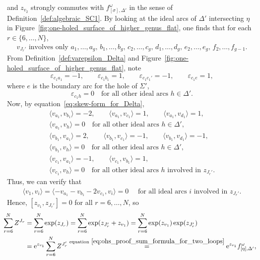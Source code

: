 \documentclass[10pt,a4paper]{amsart}
\numberwithin{equation}{section}
\theoremstyle{definition}
\begin{document}
and $z_{v_2}$ strongly commutes with $f^\omega_{[\sigma],\Delta'}$ in the sense of Definition~\ref{def:algebraic_SC1}.
By looking at the ideal arcs of $\Delta'$ intersecting $\eta$ in Figure~\ref{fig:one-holed_surface_of_higher_genus_flat}, one finds that for each $r\in\{6,\dots,N\}$,
\begin{align}
\label{eq:ohs_proof_v_J_r_prime_involves}
\mbox{$v_{J_r'}$ involves only $a_1,\dots,a_g$, $b_1,\dots,b_g$, $c_2,\dots,c_g$, $d_1,\dots,d_g$, $e_2,\dots,e_g$, $f_2,\dots,f_{g-1}$.}\!\!\!
\end{align}
From Definition~\ref{def:varepsilon_Delta} and Figure~\ref{fig:one-holed_surface_of_higher_genus_flat}, note
\[
\varepsilon_{c_1 a_1} = -1, \qquad
\varepsilon_{c_1 b_1} = 1, \qquad
\varepsilon_{c_1 c_1'} = -1, \qquad
\varepsilon_{c_1 e} = 1,
\]
where $e$ is the boundary arc for the hole of $\Sigma'$,
\[
\varepsilon_{c_1 h} =0 \quad \mbox{for all other ideal arcs $h \in \Delta'$}.
\]
Now, by equation~\eqref{eq:skew-form_for_Delta},
\begin{gather*}
 \langle v_{a_1}, v_{b_1}\rangle = -2, \qquad
\langle v_{a_1}, v_{c_1}\rangle = 1, \qquad
\langle v_{a_1}, v_{d_1}\rangle = 1, \\
\langle v_{a_1},v_h\rangle=0 \quad \mbox{for all other ideal arcs $h \in \Delta'$}, \\
\langle v_{b_1}, v_{a_1}\rangle=2,\qquad
\langle v_{b_1}, v_{c_1}\rangle = -1,\qquad
\langle v_{b_1},v_{d_1}\rangle = -1, \\
\langle v_{b_1},v_h\rangle=0 \quad \mbox{for all other ideal arcs $h \in \Delta'$}, \\
\langle v_{c_1}, v_{a_1}\rangle = -1, \qquad
\langle v_{c_1}, v_{b_1}\rangle = 1, \\
\langle v_{c_1}, v_h\rangle=0 \quad \mbox{for all other ideal arcs $h$ involved in $z_{J_r'}$}.
\end{gather*}
Thus, we can verify that
\begin{align}
\label{eq:ohs_proof_some_commutations2}
\langle v_1, v_i \rangle = \langle -v_{a_1}-v_{b_1}-2v_{c_1},v_i \rangle = 0 \quad \mbox{ for all ideal arcs $i$ involved in $z_{J_r'}$.}
\end{align}
Hence, $[z_{v_1},z_{J_r'}]=0$ for all $r=6,\dots,N$, so
\begin{align*}
\hspace{-2mm} \sum_{r=6}^{N} Z^{J_r} & = \sum_{r=6}^{N} \exp(z_{J_r})
= \sum_{r=6}^{N} \exp(z_{J_r'} + z_{v_1})
= \sum_{r=6}^{N} \exp(z_{v_1}) \exp(z_{J_r'}) \\
& = {\rm e}^{z_{v_1}} \sum_{r=6}^{N} Z^{J_r'}
\stackrel{{\rm equation}~\eqref{eq:ohs_proof_sum_formula_for_two_loops}}{=} {\rm e}^{z_{v_1}} f^\omega_{[\eta],\Delta'},
\end{align*}
\end{document}
